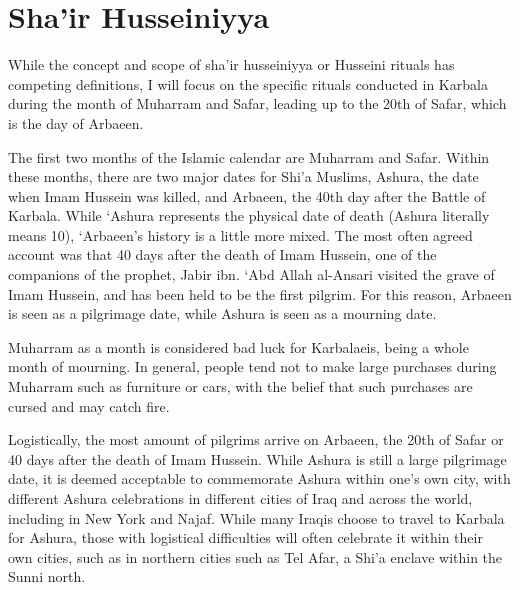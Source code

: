 \section{Sha'ir Husseiniyya}
While the concept and scope of sha’ir husseiniyya or Husseini rituals has competing definitions, I will focus on the specific rituals conducted in Karbala during the month of Muharram and Safar, leading up to the 20th of Safar, which is the day of Arbaeen. 

The first two months of the Islamic calendar are Muharram and Safar. Within these months, there are two major dates for Shi’a Muslims, Ashura, the date when Imam Hussein was killed, and Arbaeen, the 40th day after the Battle of Karbala. While ‘Ashura represents the physical date of death (Ashura literally means 10), ‘Arbaeen’s history is a little more mixed. The most often agreed account was that 40 days after the death of Imam Hussein, one of the companions of the prophet, Jabir ibn. ‘Abd Allah al-Ansari visited the grave of Imam Hussein, and has been held to be the first pilgrim. For this reason, Arbaeen is seen as a pilgrimage date, while Ashura is seen as a mourning date. 


Muharram as a month is considered bad luck for Karbalaeis, being a whole month of mourning. In general, people tend not to make large purchases during Muharram such as furniture or cars, with the belief that such purchases are cursed and may catch fire. 

Logistically, the most amount of pilgrims arrive on Arbaeen, the 20th of Safar or 40 days after the death of Imam Hussein. While Ashura is still a large pilgrimage date, it is deemed acceptable to commemorate Ashura within one’s own city, with different Ashura celebrations in different cities of Iraq and across the world, including in New York and Najaf. While many Iraqis choose to travel to Karbala for Ashura, those with logistical difficulties will often celebrate it within their own cities, such as in northern cities such as Tel Afar, a Shi'a enclave within the Sunni north.  


